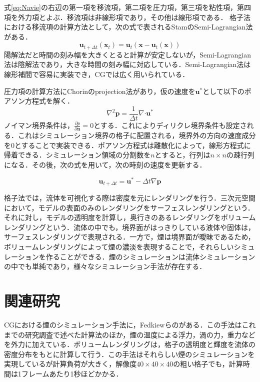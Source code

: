 \documentclass[10pt,a4paper,notitlepage,oneside,twocolumn]{abst_jsarticle}
\begin{document}
式\ref{eq:Navie}の右辺の第一項を移流項，第二項を圧力項，第三項を粘性項，第四項を外力項とよぶ．移流項は非線形項であり，その他は線形項である．
格子法における移流項の計算方法として，次の式で表されるStamのSemi-Lagrangian法\cite{semi-Lagrangian}がある．
$$\bm{u}_{t+\Delta t}(\bm{x}_t) = \bm{u}_t(\bm{x}-\bm{u}_t(\bm{x}))$$
陽解法だと時間の刻み幅を大きくとると計算が安定しないが，Semi-Lagrangian法は陰解法であり，大きな時間の刻み幅に対応している．Semi-Lagrangian法は線形補間で容易に実装でき，CGでは広く用いられている．

圧力項の計算方法にChorinのprojection法\cite{projection}があり，仮の速度を$\bm{u}^*$として以下のポアソン方程式を解く．
\begin{equation}\label{eq:colin_p}
\nabla^2 \bm{p} =  \frac{1}{\Delta t}\nabla\boldsymbol{\cdot}\bm{u}^*
\end{equation} 
ノイマン境界条件は，$\frac{\partial p}{\partial \bm{n}} = 0$とする．これによりディリクレ境界条件も設定される．これはシミュレーション境界の格子に配置される，境界外の方向の速度成分を$0$とすることで実装できる．ポアソン方程式は離散化によって，線形方程式に帰着できる．シミュレーション領域の分割数を$n$とすると，行列は$n \times n$の疎行列になる．その後，次の式を用いて，次の時刻の速度を更新する．

$$\bm{u}_{t+\Delta t} = \bm{u}^* - \Delta t \nabla \bm{p}$$

格子法では，流体を可視化する際は密度を元にレンダリングを行う．三次元空間において，モデルの表面のみのレンダリングをサーフェスレンダリングという．それに対し，モデルの透明度を計算し，奥行きのあるレンダリングをボリュームレンダリングという．流体の中でも，境界面がはっきりしている液体や固体は，サーフェスレンダリングで表現される．一方で，煙は境界面が曖昧であるため，ボリュームレンダリングによって煙の濃淡を表現することで，それらしいシミュレーションを作ることができる．煙のシミュレーションは流体シミュレーションの中でも単純であり，様々なシミュレーション手法が存在する．
\section{関連研究}
CGにおける煙のシミュレーション手法に，Fedkiewらの\cite{fedkiew}がある．この手法はこれまでの研究調査で述べた計算法のほか，煙の温度による浮力，渦の力，重力などを外力に加えている．ボリュームレンダリングは，格子の透明度と輝度を流体の密度分布をもとに計算して行う．この手法はそれらしい煙のシミュレーションを実現しているが計算負荷が大きく，解像度$40\times40\times40$の粗い格子でも，計算時間は1フレームあたり1秒ほどかかる．
\end{document}
